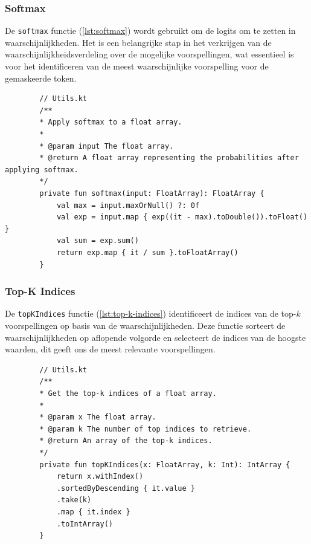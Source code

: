 \subsubsection{Softmax}

De \texttt{softmax} functie (\ref{lst:softmax}) wordt gebruikt om de \glspl{logit} om te zetten in waarschijnlijkheden. Het is een belangrijke stap in het verkrijgen van de waarschijnlijkheidsverdeling over de mogelijke voorspellingen, wat essentieel is voor het identificeren van de meest waarschijnlijke voorspelling voor de gemaskeerde token.

\begin{listing}
    \begin{verbatim}
        // Utils.kt
        /**
        * Apply softmax to a float array.
        *
        * @param input The float array.
        * @return A float array representing the probabilities after applying softmax.
        */
        private fun softmax(input: FloatArray): FloatArray {
            val max = input.maxOrNull() ?: 0f
            val exp = input.map { exp((it - max).toDouble()).toFloat() }
            val sum = exp.sum()
            return exp.map { it / sum }.toFloatArray()
        }
    \end{verbatim}
    \caption[\texttt{softmax}]{De \texttt{softmax} functie zet logits om in waarschijnlijkheden.}
    \label{lst:softmax}
\end{listing}

\subsubsection{Top-K Indices}

De \texttt{topKIndices} functie (\ref{lst:top-k-indices}) identificeert de indices van de top-\(k\) voorspellingen op basis van de waarschijnlijkheden. Deze functie sorteert de waarschijnlijkheden op aflopende volgorde en selecteert de indices van de hoogste waarden, dit geeft ons de meest relevante voorspellingen.

\begin{listing}
    \begin{verbatim}
        // Utils.kt
        /**
        * Get the top-k indices of a float array.
        *
        * @param x The float array.
        * @param k The number of top indices to retrieve.
        * @return An array of the top-k indices.
        */
        private fun topKIndices(x: FloatArray, k: Int): IntArray {
            return x.withIndex()
            .sortedByDescending { it.value }
            .take(k)
            .map { it.index }
            .toIntArray()
        }
    \end{verbatim}
    \caption[\texttt{topKIndices}]{De \texttt{topKIndices} functie identificeert de indices van de top-\(k\) voorspellingen op basis van de gesorteerde waarschijnlijkheden.}
    \label{lst:top-k-indices}
\end{listing}


